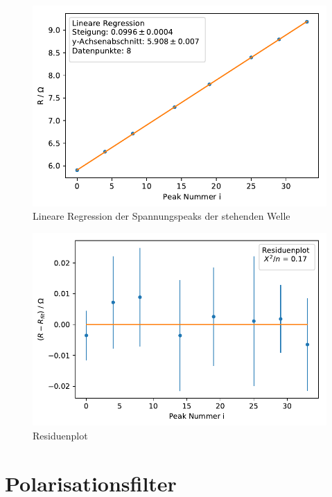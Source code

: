 \documentclass[12pt,a4paper]{article}
\begin{document}
\begin{figure}
	\centering
	\includegraphics[scale=1]{Bilder/stehendeWelle_LinReg.pdf}
	\caption{Lineare Regression der Spannungspeaks der stehenden Welle}
	\label{stehendeWelle_LinReg}
\end{figure}
\begin{figure}
	\centering
	\includegraphics[scale=1]{Bilder/stehendeWelle_Residuen.pdf}
	\caption{Residuenplot}
	\label{stehendeWelle_Residuenplot}
\end{figure}

\newpage
\section{Polarisationsfilter}
\end{document}
